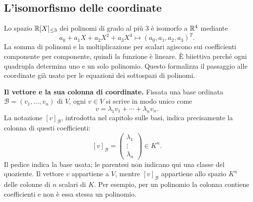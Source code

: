 \subsection{L'isomorfismo delle coordinate}
\begin{esempio}
Lo spazio $\mathbb{R}[X]_{\leq3}$ dei polinomi di grado al più $3$ è isomorfo a $\mathbb{R}^4$ mediante
\[
 a_0+a_1X+a_2X^2+a_3X^3\longmapsto(a_0,a_1,a_2,a_3)^T.
\]
La somma di polinomi e la moltiplicazione per scalari agiscono sui coefficienti componente per componente, quindi la funzione è lineare. È biiettiva perché ogni quadrupla determina uno e un solo polinomio. Questo formalizza il passaggio alle coordinate già usato per le equazioni dei sottospazi di polinomi.
\end{esempio}
\textbf{Il vettore e la sua colonna di coordinate.} Fissata una base ordinata $\mathcal B=(v_1,\ldots,v_n)$ di $V$, ogni $v\in V$ si scrive in modo unico come
\[
 v=\lambda_1v_1+\cdots+\lambda_nv_n.
\]
La notazione $[v]_{\mathcal B}$, introdotta nel capitolo sulle basi, indica precisamente la colonna di questi coefficienti:
\[
 [v]_{\mathcal B}=\begin{pmatrix}\lambda_1\\\vdots\\\lambda_n\end{pmatrix}\in K^n.
\]
Il pedice indica la base usata; le parentesi non indicano qui una classe del quoziente. Il vettore $v$ appartiene a $V$, mentre $[v]_{\mathcal B}$ appartiene allo spazio $K^n$ delle colonne di $n$ scalari di $K$. Per esempio, per un polinomio la colonna contiene coefficienti e non è essa stessa un polinomio.

